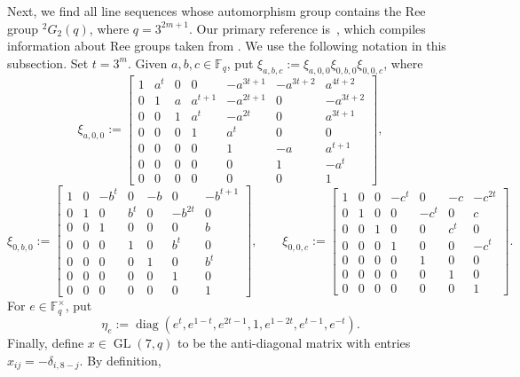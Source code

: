 \documentclass[11pt]{article}
\theoremstyle{definition}
\numberwithin{equation}{section}
\begin{document}
Next, we find all line sequences whose automorphism group contains the Ree group ${}^2G_2(q)$, where $q = 3^{2m+1}$.
Our primary reference is~\cite[Section~3]{Baarnhielm:14}, which compiles information about Ree groups taken from \cite{HuppertB:82:III,KemperLM:01,Levchuk:85,Ward:66,Wilson:09}.
We use the following notation in this subsection.
Set $t = 3^m$.
Given $a,b,c \in \mathbb{F}_q$, put $\xi_{a,b,c} := \xi_{a,0,0} \xi_{0,b,0} \xi_{0,0,c}$, where
\[
\xi_{a,0,0}
:=
\left[ \begin{array}{ccccccc}
1 & a^t & 0 & 0 & -a^{3t+1} & -a^{3t+2} & a^{4t+2} \\
0 & 1 & a & a^{t+1} & -a^{2t+1} & 0 & -a^{3t+2} \\
0 & 0 & 1 & a^t & -a^{2t} & 0 & a^{3t+1} \\
0 & 0 & 0 & 1 & a^t & 0 & 0 \\
0 & 0 & 0 & 0 & 1 & -a & a^{t+1} \\
0 & 0 & 0 & 0 & 0 & 1 & -a^t \\
0 & 0 & 0 & 0 & 0 & 0 & 1
\end{array} \right],
\]
\[
\xi_{0,b,0}
:=
\left[ \begin{array}{ccccccc}
1 & 0 & -b^t & 0 & -b & 0 & -b^{t+1} \\
0 & 1 & 0 & b^t & 0 & -b^{2t} & 0 \\
0 & 0 & 1 & 0 & 0 & 0 & b \\
0 & 0 & 0 & 1 & 0 & b^t & 0 \\
0 & 0 & 0 & 0 & 1 & 0 & b^t \\
0 & 0 & 0 & 0 & 0 & 1 & 0 \\
0 & 0 & 0 & 0 & 0 & 0 & 1
\end{array} \right],
\qquad
\xi_{0,0,c}
:=
\left[ \begin{array}{ccccccc}
1 & 0 & 0 & -c^t & 0 & -c & -c^{2t} \\
0 & 1 & 0 & 0 & -c^t & 0 & c \\
0 & 0 & 1 & 0 & 0 & c^t & 0 \\
0 & 0 & 0 & 1 & 0 & 0 & -c^t \\
0 & 0 & 0 & 0 & 1 & 0 & 0 \\
0 & 0 & 0 & 0 & 0 & 1 & 0 \\
0 & 0 & 0 & 0 & 0 & 0 & 1
\end{array} \right].
\]
For $e \in \mathbb{F}_q^\times$, put
\[
\eta_e := \operatorname{diag}(e^t, e^{1-t}, e^{2t-1}, 1, e^{1-2t}, e^{t-1}, e^{-t}).
\]
Finally, define $x \in \operatorname{GL}(7,q)$ to be the anti-diagonal matrix with entries $x_{ij} = - \delta_{i,8-j}$.
By definition,
\end{document}
